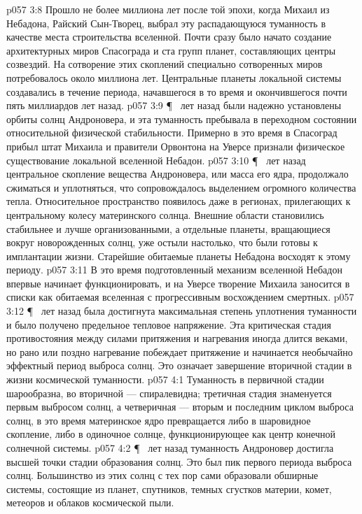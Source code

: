 \vs p057 3:8 Прошло не более миллиона лет после той эпохи, когда Михаил из Небадона, Райский Сын\hyp{}Творец, выбрал эту распадающуюся туманность в качестве места строительства вселенной. Почти сразу было начато создание архитектурных миров Спасограда и ста групп планет, составляющих центры созвездий. На сотворение этих скоплений специально сотворенных миров потребовалось около миллиона лет. Центральные планеты локальной системы создавались в течение периода, начавшегося в то время и окончившегося почти пять миллиардов лет назад.
\vs p057 3:9 \P\  лет назад были надежно установлены орбиты солнц Андроновера, и эта туманность пребывала в переходном состоянии относительной физической стабильности. Примерно в это время в Спасоград прибыл штат Михаила и правители Орвонтона на Уверсе признали физическое существование локальной вселенной Небадон.
\vs p057 3:10 \P\  лет назад центральное скопление вещества Андроновера, или масса его ядра, продолжало сжиматься и уплотняться, что сопровождалось выделением огромного количества тепла. Относительное пространство появилось даже в регионах, прилегающих к центральному колесу материнского солнца. Внешние области становились стабильнее и лучше организованными, а отдельные планеты, вращающиеся вокруг новорожденных солнц, уже остыли настолько, что были готовы к имплантации жизни. Старейшие обитаемые планеты Небадона восходят к этому периоду.
\vs p057 3:11 В это время подготовленный механизм вселенной Небадон впервые начинает функционировать, и на Уверсе творение Михаила заносится в списки как обитаемая вселенная с прогрессивным восхождением смертных.
\vs p057 3:12 \P\  лет назад была достигнута максимальная степень уплотнения туманности и было получено предельное тепловое напряжение. Эта критическая стадия противостояния между силами притяжения и нагревания иногда длится веками, но рано или поздно нагревание побеждает притяжение и начинается необычайно эффектный период выброса солнц. Это означает завершение вторичной стадии в жизни космической туманности.
\vs p057 4:1 Туманность в первичной стадии шарообразна, во вторичной --- спиралевидна; третичная стадия знаменуется первым выбросом солнц, а четверичная --- вторым и последним циклом выброса солнц, в это время материнское ядро превращается либо в шаровидное скопление, либо в одиночное солнце, функционирующее как центр конечной солнечной системы.
\vs p057 4:2 \P\  лет назад туманность Андроновер достигла высшей точки стадии образования солнц. Это был пик первого периода выброса солнц. Большинство из этих солнц с тех пор сами образовали обширные системы, состоящие из планет, спутников, темных сгустков материи, комет, метеоров и облаков космической пыли.
